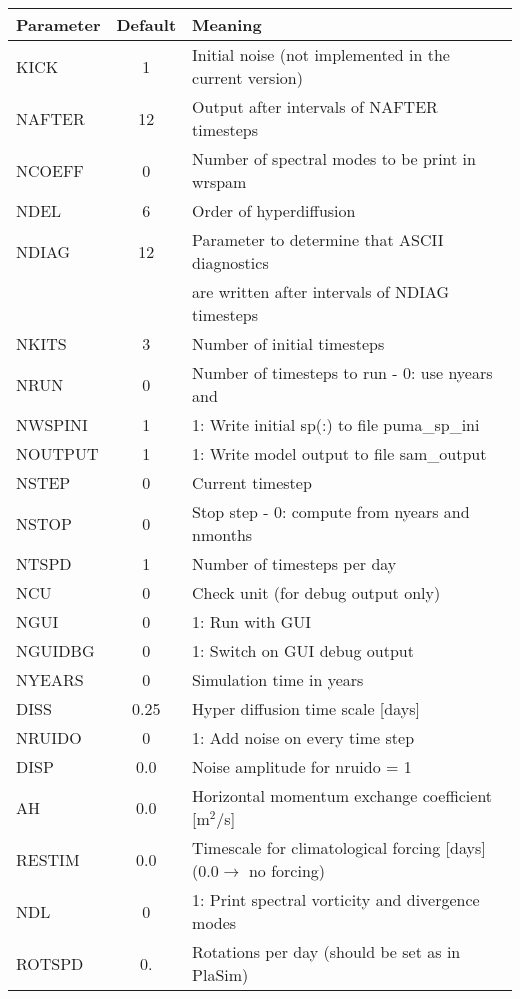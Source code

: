\begin{tabular}{|l|c|l|}
\hline
Parameter & Default & Meaning\\
\hline
KICK     & 1        & Initial noise (not implemented in the current version)\\
NAFTER   & 12       & Output after intervals of NAFTER timesteps\\
NCOEFF   & 0        & Number of spectral modes to be print in wrspam\\ 
NDEL     & 6        & Order of hyperdiffusion\\
NDIAG    & 12       & Parameter to determine that ASCII diagnostics \\ 
         &          & are written after intervals of NDIAG timesteps\\
NKITS    &  3       & Number of initial timesteps\\
NRUN     &  0       & Number of timesteps to run - 0: use nyears and\\
NWSPINI  &  1       & 1: Write initial sp(:) to file puma\_sp\_ini\\
NOUTPUT  &  1       & 1: Write model output to file sam\_output\\
NSTEP    &  0       & Current timestep\\
NSTOP    &  0       & Stop step - 0: compute from nyears and nmonths\\
NTSPD    &  1       & Number of timesteps per day\\
NCU      &  0       & Check unit (for debug output only)\\
NGUI     &  0       & 1: Run with GUI\\
NGUIDBG  &  0       & 1: Switch on GUI debug output\\
NYEARS   &  0       & Simulation time in years\\
DISS     &  0.25    & Hyper diffusion time scale [days]\\
NRUIDO   &  0       & 1: Add noise on every time step\\
DISP     &  0.0     & Noise amplitude for nruido = 1\\
AH       &  0.0     & Horizontal momentum exchange coefficient [m$^2$/s]\\
RESTIM   &  0.0     & Timescale for climatological forcing [days] (0.0$\rightarrow$ no forcing)\\
NDL      &  0       & 1: Print spectral vorticity and divergence modes\\
ROTSPD   &  0.      & Rotations per day  (should be set as in PlaSim)\\

\end{tabular}

